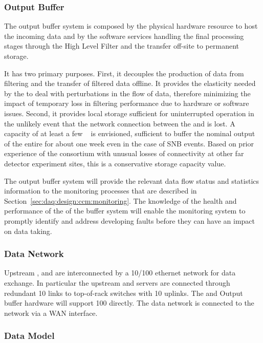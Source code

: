 \subsubsection{Output Buffer}

The output buffer system is composed by the physical hardware resource
to host the incoming data and by the software services handling the
final processing stages through the High Level Filter and the transfer off-site to permanent storage.

It has two primary purposes.  First, it decouples the production of data from filtering and the
transfer of filtered data offline. It provides the elasticity needed by the  to deal with
perturbations in the flow of data, therefore minimizing the impact of temporary loss in filtering
performance due to hardware or software issues. Second, it provides local storage sufficient for
uninterrupted  operation in the unlikely event that the network connection between the
 and \fnal is lost.  A capacity of at least a few \si{\peta\byte} is envisioned,
sufficient to buffer the nominal output of the entire  for about one week even in the case of SNB events. Based on prior experience of the consortium with unusual losses of  connectivity at
other far detector experiment sites, this is a conservative storage capacity value.

The output buffer system will provide the relevant data flow status and statistics information to the monitoring processes that are described in Section~\ref{sec:daq:design:ccm:monitoring}. The knowledge of the health and performance of the of the buffer system will enable the monitoring system to promptly identify and address developing faults before they can have an impact on data taking.


\subsubsection{Data Network}
Upstream ,  and   are interconnected by a \SI{10/100}{\Gbps} ethernet network for data exchange.
In particular the upstream  and  servers are connected through redundant \SI{10}{\Gbps} links to top-of-rack switches with \SI{10}{\Gbps} uplinks.
The  and Output buffer hardware will support \SI{100}{\Gbps} directly.
The  data network is connected to the \fnal network via a WAN interface.

\subsubsection{Data Model}
\label{sec:daq:design-data-model}

